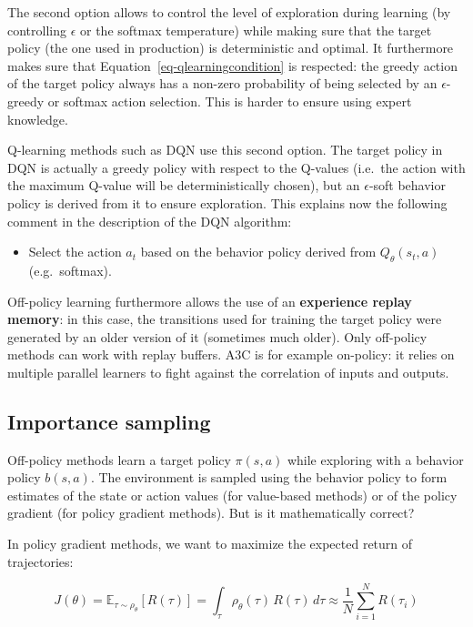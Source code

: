 \documentclass[
  letterpaper,
  DIV=11,
  numbers=noendperiod]{scrreprt}
\providecommand{\tightlist}{%
  \setlength{\itemsep}{0pt}\setlength{\parskip}{0pt}}\usepackage{longtable,booktabs,array}
\begin{document}
The second option allows to control the level of exploration during
learning (by controlling \(\epsilon\) or the softmax temperature) while
making sure that the target policy (the one used in production) is
deterministic and optimal. It furthermore makes sure that
Equation~\ref{eq-qlearningcondition} is respected: the greedy action of
the target policy always has a non-zero probability of being selected by
an \(\epsilon\)-greedy or softmax action selection. This is harder to
ensure using expert knowledge.

Q-learning methods such as DQN use this second option. The target policy
in DQN is actually a greedy policy with respect to the Q-values
(i.e.~the action with the maximum Q-value will be deterministically
chosen), but an \(\epsilon\)-soft behavior policy is derived from it to
ensure exploration. This explains now the following comment in the
description of the DQN algorithm:

\begin{itemize}
\tightlist
\item
  Select the action \(a_t\) based on the behavior policy derived from
  \(Q_\theta(s_t, a)\) (e.g.~softmax).
\end{itemize}

Off-policy learning furthermore allows the use of an \textbf{experience
replay memory}: in this case, the transitions used for training the
target policy were generated by an older version of it (sometimes much
older). Only off-policy methods can work with replay buffers. A3C is for
example on-policy: it relies on multiple parallel learners to fight
against the correlation of inputs and outputs.

\hypertarget{importance-sampling}{%
\subsection{Importance sampling}\label{importance-sampling}}

Off-policy methods learn a target policy \(\pi(s,a)\) while exploring
with a behavior policy \(b(s,a)\). The environment is sampled using the
behavior policy to form estimates of the state or action values (for
value-based methods) or of the policy gradient (for policy gradient
methods). But is it mathematically correct?

In policy gradient methods, we want to maximize the expected return of
trajectories:

\[
    J(\theta) = \mathbb{E}_{\tau \sim \rho_\theta}[R(\tau)] = \int_\tau \rho_\theta(\tau) \, R(\tau) \, d\tau \approx \frac{1}{N} \sum_{i=1}^N R(\tau_i)
\]
\end{document}
